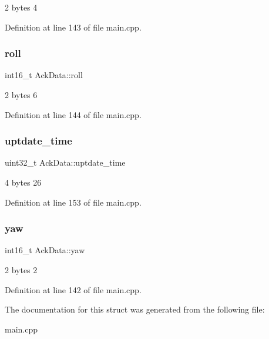 2 bytes 4 



Definition at line 143 of file main.\+cpp.

\mbox{\label{structAckData_a9927c12b1934c847ddc3726f0d400208}} 
\subsubsection{\texorpdfstring{roll}{roll}}
{\footnotesize\ttfamily int16\+\_\+t Ack\+Data\+::roll}



2 bytes 6 



Definition at line 144 of file main.\+cpp.

\mbox{\label{structAckData_a577cc4e03ced6b2702d3a58260c05123}} 
\subsubsection{\texorpdfstring{uptdate\_time}{uptdate\_time}}
{\footnotesize\ttfamily uint32\+\_\+t Ack\+Data\+::uptdate\+\_\+time}



4 bytes 26 



Definition at line 153 of file main.\+cpp.

\mbox{\label{structAckData_ae33faf57319caab2179b12d7ed22dee7}} 
\subsubsection{\texorpdfstring{yaw}{yaw}}
{\footnotesize\ttfamily int16\+\_\+t Ack\+Data\+::yaw}



2 bytes 2 



Definition at line 142 of file main.\+cpp.



The documentation for this struct was generated from the following file\+:\begin{DoxyCompactItemize}
\item 
main.\+cpp\end{DoxyCompactItemize}
